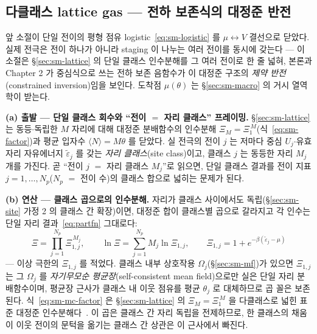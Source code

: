 \subsection{다클래스 lattice gas --- 전하 보존식의 대정준 반전}\label{sec:sm-multiclass}
앞 소절이 단일 전이의 평형 점유 logistic~\eqref{eq:sm-logistic} 를 $\mu\leftrightarrow V$ 결선으로 닫았다. 실제
전극은 전이 하나가 아니라 staging 이 나누는 여러 전이를 동시에 갖는다 --- 이 소절은 \S\ref{sec:sm-lattice} 의
단일 클래스 인수분해를 그 여러 전이로 한 줄 넓혀, 본론과 Chapter 2 가 중심식으로 쓰는 전하 보존 음함수가 이
대정준 구조의 \emph{제약 반전}(constrained inversion)임을 보인다. 도착점 $\mu(\theta)$ 는 \S\ref{sec:sm-macro}
의 거시 열역학이 받는다.

\textbf{(a) 출발 --- 단일 클래스 회수와 ``전이 $=$ 자리 클래스'' 프레이밍.} \S\ref{sec:sm-lattice} 는 동등$\cdot$독립한
$M$ 자리에 대해 대정준 분배함수의 인수분해 $\Xi_M=\Xi_1^{\,M}$(식~\eqref{eq:sm-factor})과 평균 입자수
$\langle N\rangle=M\theta$ 를 닫았다. 실 전극의 전이 $j$ 는 저마다 중심 $U_j$$\cdot$유효 자리 자유에너지
$\tilde\varepsilon_j$ 를 갖는 \emph{자리 클래스}(site class)이고, 클래스 $j$ 는 동등한 자리 $M_j$ 개를 가진다.
곧 ``전이 $j$ $=$ 자리 클래스 $M_j$''로 읽으면, 단일 클래스 결과를 전이 지표 $j=1,\dots,N_p$($N_p$ $=$ 전이
수)의 클래스 합으로 넓히는 문제가 된다.

\textbf{(b) 연산 --- 클래스 곱으로의 인수분해.} 자리가 클래스 사이에서도 독립(\S\ref{sec:sm-site} 가정 2 의
클래스 간 확장)이면, 대정준 합이 클래스별 곱으로 갈라지고 각 인수는 단일 자리 결과~\eqref{eq:partfn} 그대로다:
\begin{equation}
\Xi=\prod_{j=1}^{N_p}\Xi_{1,j}^{\,M_j},
\qquad
\ln\Xi=\sum_{j=1}^{N_p}M_j\ln\Xi_{1,j},
\qquad
\Xi_{1,j}=1+e^{-\beta(\tilde\varepsilon_j-\mu)}
\label{eq:sm-mc-factor}
\end{equation}
--- 이상 극한의 $\Xi_{1,j}$ 를 적었다. 클래스 내부 상호작용 $\Omega_j$(\S\ref{sec:sm-mf})가 있으면 $\Xi_{1,j}$
는 그 $\Omega_j$ 를 \emph{자기무모순 평균장}(self-consistent mean field)으로만 실은 단일 자리 분배함수이며,
평균장 근사가 클래스 내 이웃 점유를 평균 $\theta_j$ 로 대체하므로 곱 꼴은 보존된다. 식~\eqref{eq:sm-mc-factor}
은 \S\ref{sec:sm-lattice} 의 $\Xi_M=\Xi_1^{\,M}$ 을 다클래스로 넓힌 표준 대정준
인수분해다~\cite{hill1960,mcquarrie1976}. 이 곱은 클래스 간 자리 독립을 전제하므로, 한 클래스의 채움이 이웃
전이의 문턱을 옮기는 클래스 간 상관은 이 근사에서 빠진다.


